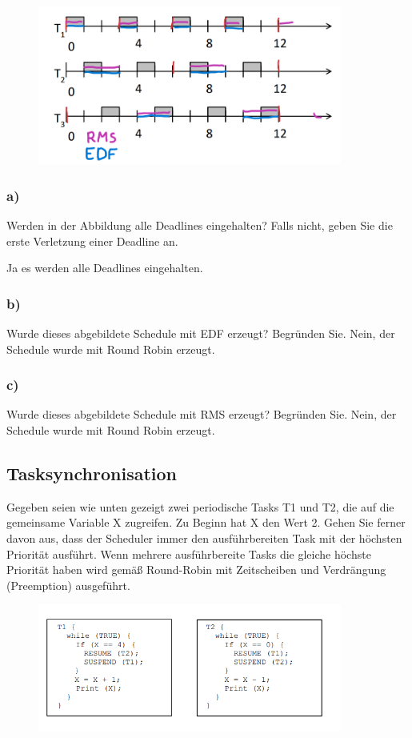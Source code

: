 \begin{figure}[H]
  \includegraphics[width=10cm]{images/KA140421/3a.PNG}
  \centering
\end{figure}

\subsubsection{a)}
Werden in der Abbildung alle Deadlines eingehalten? Falls nicht, geben Sie die erste Verletzung
einer Deadline an.

Ja es werden alle Deadlines eingehalten.

\subsubsection{b)}
Wurde dieses abgebildete Schedule mit EDF erzeugt? Begründen Sie.
Nein, der Schedule wurde mit Round Robin erzeugt.

\subsubsection{c)}
Wurde dieses abgebildete Schedule mit RMS erzeugt? Begründen Sie.
Nein, der Schedule wurde mit Round Robin erzeugt.

\subsection{Tasksynchronisation}
Gegeben seien wie unten gezeigt zwei periodische Tasks T1 und T2, die auf die gemeinsame Variable X
zugreifen. Zu Beginn hat X den Wert 2. Gehen Sie ferner davon aus, dass der Scheduler immer den
ausführbereiten Task mit der höchsten Priorität ausführt. Wenn mehrere ausführbereite Tasks die gleiche
höchste Priorität haben wird gemäß Round-Robin mit Zeitscheiben und Verdrängung (Preemption)
ausgeführt.

\begin{figure}[H]
  \includegraphics[width=10cm]{images/KA140421/4a.PNG}
  \centering
\end{figure}

